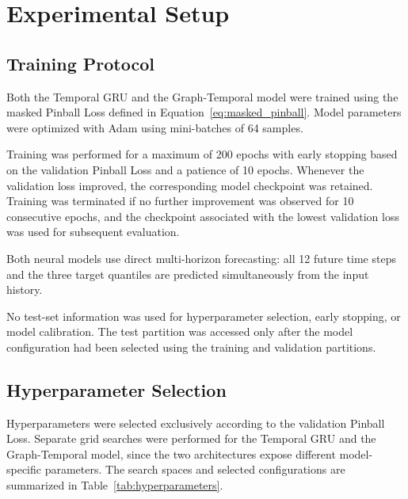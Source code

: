 \section{Experimental Setup}
\label{sec:experimental_setup}

\subsection{Training Protocol}
\label{subsec:training}

Both the Temporal GRU and the Graph-Temporal model were trained using the
masked Pinball Loss defined in Equation~\ref{eq:masked_pinball}. Model
parameters were optimized with Adam using mini-batches of 64 samples.

Training was performed for a maximum of 200 epochs with early stopping based
on the validation Pinball Loss and a patience of 10 epochs. Whenever the
validation loss improved, the corresponding model checkpoint was retained.
Training was terminated if no further improvement was observed for 10
consecutive epochs, and the checkpoint associated with the lowest validation
loss was used for subsequent evaluation.

Both neural models use direct multi-horizon forecasting: all 12 future time
steps and the three target quantiles are predicted simultaneously from the
input history.

No test-set information was used for hyperparameter selection, early stopping,
or model calibration. The test partition was accessed only after the model
configuration had been selected using the training and validation partitions.


\subsection{Hyperparameter Selection}
\label{subsec:hyperparameters}

Hyperparameters were selected exclusively according to the validation
Pinball Loss. Separate grid searches were performed for the Temporal GRU and
the Graph-Temporal model, since the two architectures expose different
model-specific parameters. The search spaces and selected configurations are
summarized in Table~\ref{tab:hyperparameters}.

